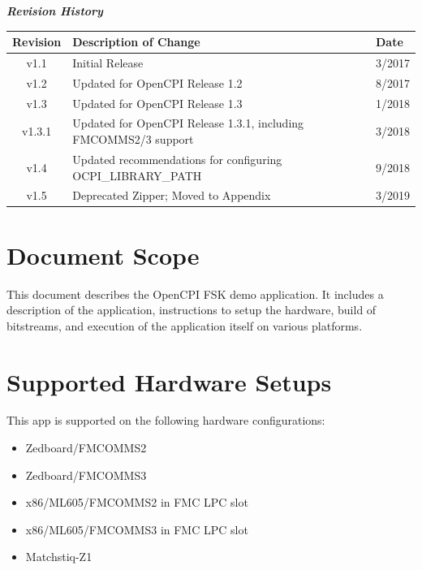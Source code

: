 \maketitle
\newpage
	\begin{center}
	\textit{\textbf{Revision History}}
		\begin{table}[H]
		\label{table:revisions} %
			\begin{tabularx}{\textwidth}{|c|X|l|}
			\hline
			\rowcolor{blue}
			\textbf{Revision} & \textbf{Description of Change} & \textbf{Date} \\
		    \hline
		    v1.1 & Initial Release & 3/2017 \\
		    \hline
		    v1.2 & Updated for OpenCPI Release 1.2 & 8/2017 \\
			\hline
			v1.3 & Updated for OpenCPI Release 1.3 & 1/2018 \\
			\hline
			v1.3.1 & Updated for OpenCPI Release 1.3.1, including FMCOMMS2/3 support & 3/2018 \\
			\hline
			v1.4 & Updated recommendations for configuring OCPI\_LIBRARY\_PATH & 9/2018 \\
			\hline
			v1.5 & Deprecated Zipper; Moved to Appendix & 3/2019 \\
			\hline
			\end{tabularx}
		\end{table}
	\end{center}

\newpage
\tableofcontents
\pagebreak
\section{Document Scope}
This document describes the OpenCPI FSK demo application. It includes a description of the application, instructions to setup the hardware, build of bitstreams, and execution of the application itself on various platforms.

\section{Supported Hardware Setups}
This app is supported on the following hardware configurations:
\begin{itemize}
  \item Zedboard/FMCOMMS2
  \item Zedboard/FMCOMMS3
  \item x86/ML605/FMCOMMS2 in FMC LPC slot
  \item x86/ML605/FMCOMMS3 in FMC LPC slot
  \item Matchstiq-Z1
\end{itemize}

